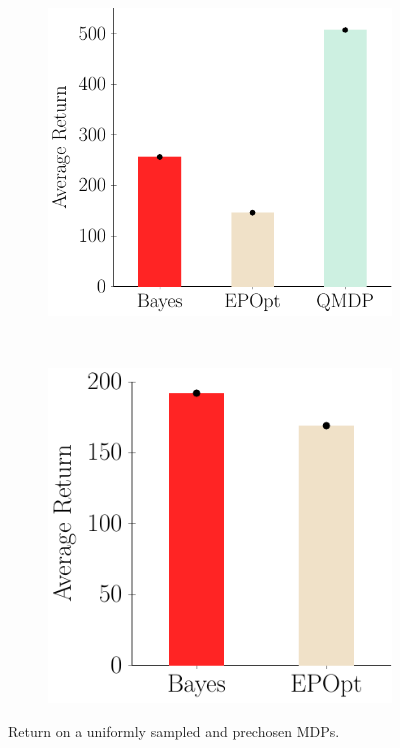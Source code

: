 \documentclass{article}
\begin{document}
\begin{figure}[t!]
\begin{centering}
\begin{subfigure}[b]{0.3\columnwidth}
\includegraphics[width=\linewidth]{figs/cheetah_env_comparison.pdf}
\label{fig:oneFromK}
\end{subfigure}
~
\begin{subfigure}[b]{0.29\columnwidth}
\includegraphics[width=\linewidth]{figs/cheetah_average.pdf}
\label{fig:all20}
\end{subfigure}
\end{centering}
\caption{Return on a uniformly sampled and prechosen MDPs.}
\label{fig:Bars}
\end{figure}
\end{document}
